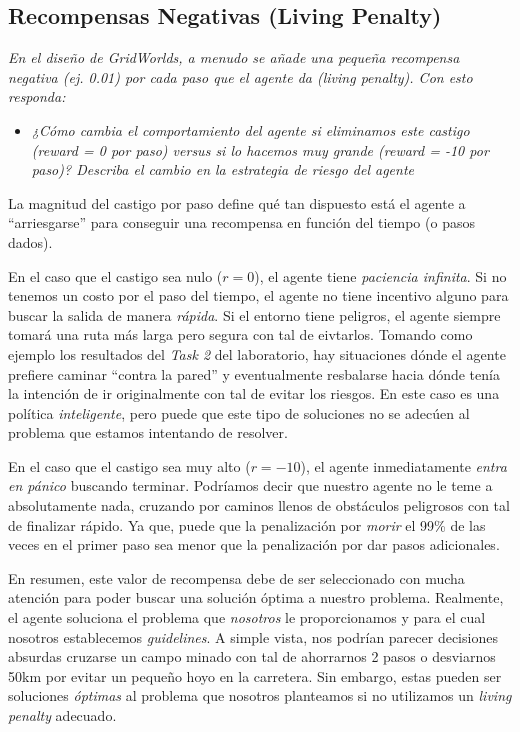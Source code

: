 \documentclass[11pt]{article}
\begin{document}
\subsection*{Recompensas Negativas (Living Penalty)}
\noindent\textit{En el diseño de GridWorlds, a menudo se añade una pequeña recompensa negativa (ej. 0.01) por cada
paso que el agente da (living penalty). Con esto responda:}

\begin{itemize}
  \item \textit{¿Cómo cambia el comportamiento del agente si eliminamos este castigo (reward = 0 por paso) versus
    si lo hacemos muy grande (reward = -10 por paso)? Describa el cambio en la estrategia de riesgo del agente}
\end{itemize}

\noindent La magnitud del castigo por paso define qué tan dispuesto está el agente a ``arriesgarse'' para conseguir una recompensa
en función del tiempo (o pasos dados).

\vspace{0.5em}

\noindent En el caso que el castigo sea nulo ($r = 0$), el agente tiene \textit{paciencia infinita}. Si no tenemos un costo por el paso del tiempo,
el agente no tiene incentivo alguno para buscar la salida de manera \textit{rápida}. Si el entorno tiene peligros, el agente siempre
tomará una ruta más larga pero segura con tal de eivtarlos. Tomando como ejemplo los resultados del \textit{Task 2} del laboratorio, hay
situaciones dónde el agente prefiere caminar ``contra la pared'' y eventualmente resbalarse hacia dónde tenía la intención de ir originalmente
con tal de evitar los riesgos. En este caso es una política \textit{inteligente}, pero puede que este tipo de soluciones no se adecúen al
problema que estamos intentando de resolver.

\vspace{0.5em}

\noindent En el caso que el castigo sea muy alto ($r = -10$), el agente inmediatamente \textit{entra en pánico} buscando terminar. Podríamos
decir que nuestro agente no le teme a absolutamente nada, cruzando por caminos llenos de obstáculos peligrosos con tal de finalizar rápido.
Ya que, puede que la penalización por \textit{morir} el 99\% de las veces en el primer paso sea menor que la penalización por dar pasos adicionales.

\vspace{0.5em}

\noindent En resumen, este valor de recompensa debe de ser seleccionado con mucha atención para poder buscar una solución óptima a nuestro
problema. Realmente, el agente soluciona el problema que \textit{nosotros} le proporcionamos y para el cual nosotros establecemos \textit{guidelines}.
A simple vista, nos podrían parecer decisiones absurdas cruzarse un campo minado con tal de ahorrarnos 2 pasos o desviarnos 50km por
evitar un pequeño hoyo en la carretera. Sin embargo, estas pueden ser soluciones \textit{óptimas} al problema que nosotros planteamos
si no utilizamos un \textit{living penalty} adecuado.
\end{document}
